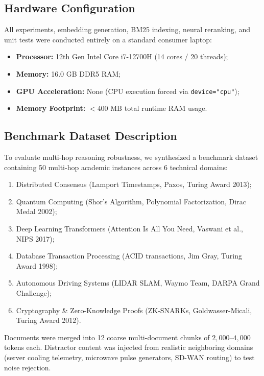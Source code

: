\documentclass[lettersize,journal]{IEEEtran}
\begin{document}
\subsection{Hardware Configuration}
All experiments, embedding generation, BM25 indexing, neural reranking, and unit tests were conducted entirely on a standard consumer laptop:
\begin{itemize}
    \item \textbf{Processor:} 12th Gen Intel Core i7-12700H (14 cores / 20 threads);
    \item \textbf{Memory:} 16.0 GB DDR5 RAM;
    \item \textbf{GPU Acceleration:} None (CPU execution forced via \texttt{device="cpu"});
    \item \textbf{Memory Footprint:} $<400\text{ MB}$ total runtime RAM usage.
\end{itemize}

\subsection{Benchmark Dataset Description}
To evaluate multi-hop reasoning robustness, we synthesized a benchmark dataset containing 50 multi-hop academic instances across 6 technical domains:
\begin{enumerate}
    \item Distributed Consensus (Lamport Timestamps, Paxos, Turing Award 2013);
    \item Quantum Computing (Shor's Algorithm, Polynomial Factorization, Dirac Medal 2002);
    \item Deep Learning Transformers (Attention Is All You Need, Vaswani et al., NIPS 2017);
    \item Database Transaction Processing (ACID transactions, Jim Gray, Turing Award 1998);
    \item Autonomous Driving Systems (LIDAR SLAM, Waymo Team, DARPA Grand Challenge);
    \item Cryptography \& Zero-Knowledge Proofs (ZK-SNARKs, Goldwasser-Micali, Turing Award 2012).
\end{enumerate}
Documents were merged into 12 coarse multi-document chunks of $2,000$--$4,000$ tokens each. Distractor content was injected from realistic neighboring domains (server cooling telemetry, microwave pulse generators, SD-WAN routing) to test noise rejection.
\end{document}
